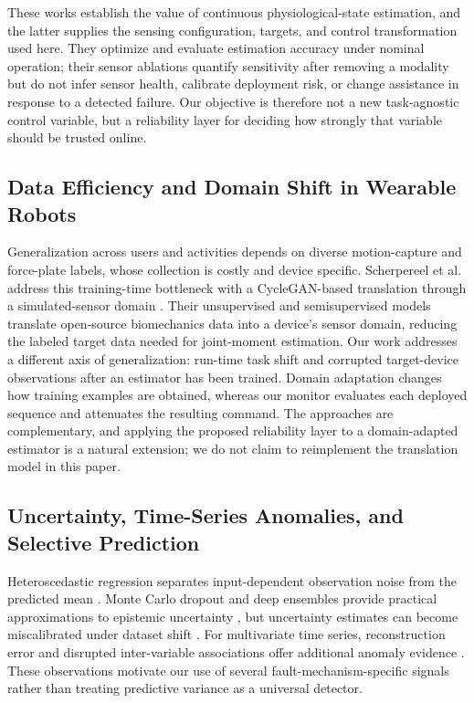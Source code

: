 \documentclass[letterpaper]{article} %
\begin{document}
These works establish the value of continuous physiological-state estimation, and the latter supplies the sensing configuration, targets, and control transformation used here.
They optimize and evaluate estimation accuracy under nominal operation; their sensor ablations quantify sensitivity after removing a modality but do not infer sensor health, calibrate deployment risk, or change assistance in response to a detected failure.
Our objective is therefore not a new task-agnostic control variable, but a reliability layer for deciding how strongly that variable should be trusted online.

\subsection{Data Efficiency and Domain Shift in Wearable Robots}

Generalization across users and activities depends on diverse motion-capture and force-plate labels, whose collection is costly and device specific.
Scherpereel et al. address this training-time bottleneck with a CycleGAN-based translation through a simulated-sensor domain \citep{scherpereel2025domain}.
Their unsupervised and semisupervised models translate open-source biomechanics data into a device's sensor domain, reducing the labeled target data needed for joint-moment estimation.
Our work addresses a different axis of generalization: run-time task shift and corrupted target-device observations after an estimator has been trained.
Domain adaptation changes how training examples are obtained, whereas our monitor evaluates each deployed sequence and attenuates the resulting command.
The approaches are complementary, and applying the proposed reliability layer to a domain-adapted estimator is a natural extension; we do not claim to reimplement the translation model in this paper.

\subsection{Uncertainty, Time-Series Anomalies, and Selective Prediction}

Heteroscedastic regression separates input-dependent observation noise from the predicted mean \citep{kendall2017uncertainties}.
Monte Carlo dropout and deep ensembles provide practical approximations to epistemic uncertainty \citep{gal2016dropout,lakshminarayanan2017ensembles}, but uncertainty estimates can become miscalibrated under dataset shift \citep{ovadia2019trust}.
For multivariate time series, reconstruction error and disrupted inter-variable associations offer additional anomaly evidence \citep{song2023memto,dai2024sarad}.
These observations motivate our use of several fault-mechanism-specific signals rather than treating predictive variance as a universal detector.
\end{document}
